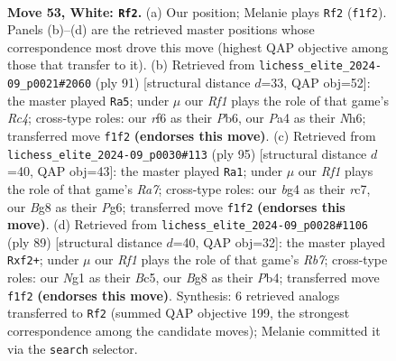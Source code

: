 \documentclass[11pt]{article}
\begin{document}
\clearpage

\begin{figure}[p]\centering
\begin{subfigure}{0.46\textwidth}\centering
\resizebox{\linewidth}{!}{%
\newchessgame
\chessboard[
  setfen={6B1/3k4/5r2/B7/P5bp/1PK2p2/8/5RN1 w - - 0 53},
  showmover=false,
  pgfstyle=straightmove, color=movearrow, markmove={f1-f2}
]}
\caption{}
\end{subfigure}\hfill
\begin{subfigure}{0.46\textwidth}\centering
\resizebox{\linewidth}{!}{%
\newchessgame
\chessboard[
  setfen={8/p1k5/1p3pBn/2r1b2P/8/2P1R3/P1K5/8 b - - 16 46},
  showmover=false,
  pgfstyle=straightmove, color=movearrow, markmove={c5-a5}
]}
\caption{}
\end{subfigure}
\\[4pt]
\begin{subfigure}{0.46\textwidth}\centering
\resizebox{\linewidth}{!}{%
\newchessgame
\chessboard[
  setfen={8/2R5/6p1/4p1P1/3bk3/8/r1PBK3/8 b - - 4 48},
  showmover=false,
  pgfstyle=straightmove, color=movearrow, markmove={a2-a1}
]}
\caption{}
\end{subfigure}\hfill
\begin{subfigure}{0.46\textwidth}\centering
\resizebox{\linewidth}{!}{%
\newchessgame
\chessboard[
  setfen={4k3/8/8/2b4P/1pB5/3R4/Pr3PK1/8 b - - 0 45},
  showmover=false,
  pgfstyle=straightmove, color=movearrow, markmove={b2-f2}
]}
\caption{}
\end{subfigure}
\caption{\textbf{Move 53, White: \texttt{Rf2}.} (a) Our position; Melanie plays \texttt{Rf2} (\texttt{f1f2}). Panels (b)--(d) are the retrieved master positions whose correspondence most drove this move (highest QAP objective among those that transfer to it). (b) Retrieved from \texttt{lichess\_elite\_2024-09\_p0021\#2060} (ply 91) [structural distance $d$=33, QAP obj=52]: the master played \texttt{Ra5}; under $\mu$ our \emph{Rf1} plays the role of that game's \emph{Rc4}; cross-type roles: our \emph{r}f6 as their \emph{P}b6, our \emph{P}a4 as their \emph{N}h6; transferred move \texttt{f1f2} \textbf{(endorses this move)}. (c) Retrieved from \texttt{lichess\_elite\_2024-09\_p0030\#113} (ply 95) [structural distance $d$=40, QAP obj=43]: the master played \texttt{Ra1}; under $\mu$ our \emph{Rf1} plays the role of that game's \emph{Ra7}; cross-type roles: our \emph{b}g4 as their \emph{r}c7, our \emph{B}g8 as their \emph{P}g6; transferred move \texttt{f1f2} \textbf{(endorses this move)}. (d) Retrieved from \texttt{lichess\_elite\_2024-09\_p0028\#1106} (ply 89) [structural distance $d$=40, QAP obj=32]: the master played \texttt{Rxf2+}; under $\mu$ our \emph{Rf1} plays the role of that game's \emph{Rb7}; cross-type roles: our \emph{N}g1 as their \emph{B}c5, our \emph{B}g8 as their \emph{P}b4; transferred move \texttt{f1f2} \textbf{(endorses this move)}. Synthesis: 6 retrieved analogs transferred to \texttt{Rf2} (summed QAP objective 199, the strongest correspondence among the candidate moves); Melanie committed it via the \texttt{search} selector.}
\label{fig:thought-m104}
\end{figure}
\end{document}
